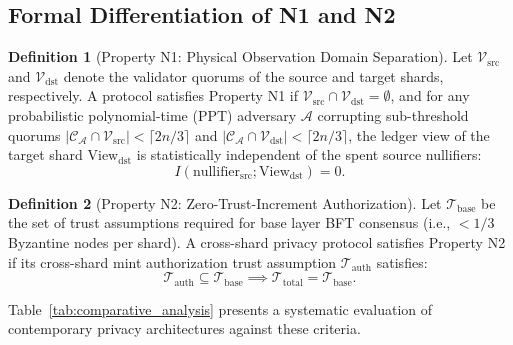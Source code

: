 \documentclass[journal,10pt,twocolumn]{IEEEtran}
\theoremstyle{definition}
\newtheorem{definition}{Definition}
\theoremstyle{remark}
\begin{document}
\subsection{Formal Differentiation of N1 and N2}

\begin{definition}[Property N1: Physical Observation Domain Separation]
Let $\mathcal{V}_{\text{src}}$ and $\mathcal{V}_{\text{dst}}$ denote the validator quorums of the source and target shards, respectively. A protocol satisfies Property N1 if $\mathcal{V}_{\text{src}} \cap \mathcal{V}_{\text{dst}} = \emptyset$, and for any probabilistic polynomial-time (PPT) adversary $\mathcal{A}$ corrupting sub-threshold quorums $|\mathcal{C}_{\mathcal{A}} \cap \mathcal{V}_{\text{src}}| < \lceil 2n/3 \rceil$ and $|\mathcal{C}_{\mathcal{A}} \cap \mathcal{V}_{\text{dst}}| < \lceil 2n/3 \rceil$, the ledger view of the target shard $\text{View}_{\text{dst}}$ is statistically independent of the spent source nullifiers:
\begin{equation}
I(\text{nullifier}_{\text{src}}; \text{View}_{\text{dst}}) = 0.
\end{equation}
\end{definition}

\begin{definition}[Property N2: Zero-Trust-Increment Authorization]
Let $\mathcal{T}_{\text{base}}$ be the set of trust assumptions required for base layer BFT consensus (i.e., $< 1/3$ Byzantine nodes per shard). A cross-shard privacy protocol satisfies Property N2 if its cross-shard mint authorization trust assumption $\mathcal{T}_{\text{auth}}$ satisfies:
\begin{equation}
\mathcal{T}_{\text{auth}} \subseteq \mathcal{T}_{\text{base}} \implies \mathcal{T}_{\text{total}} = \mathcal{T}_{\text{base}}.
\end{equation}
\end{definition}

Table~\ref{tab:comparative_analysis} presents a systematic evaluation of contemporary privacy architectures against these criteria.
\end{document}
